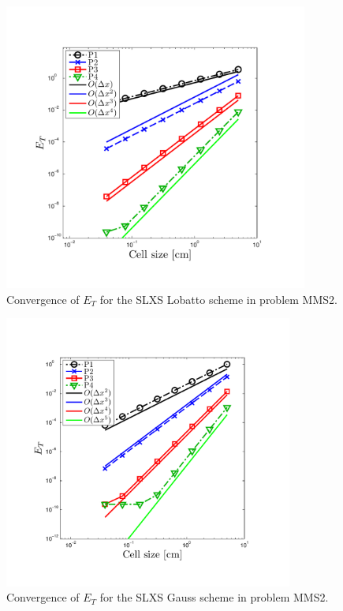 \begin{figure}[!hbp]
\centering
\includegraphics[width=10cm,trim=0.25in  0.25in 0.75in 0.75in,clip=true]{chapter6_grey_radtran/Dissertation_Data/MMS3_SLXS_Lobatto_temp_L2.pdf}
\caption{Convergence of $E_{T}$ for the SLXS Lobatto scheme in problem MMS2.}
\label{fig:mms3_slxs_lobatto_e_t}
\end{figure}
%
%
\begin{figure}[!htp]
\centering
\includegraphics[width=9.5cm,trim=0.25in  0.25in 0.75in 0.75in,clip=true]{chapter6_grey_radtran/Dissertation_Data/MMS3_SLXS_Gauss_temp_L2.pdf}
\caption{Convergence of $E_{T}$ for the SLXS Gauss scheme in problem MMS2.}
\label{fig:mms3_slxs_gauss_e_t}
\end{figure}
%
%
%
